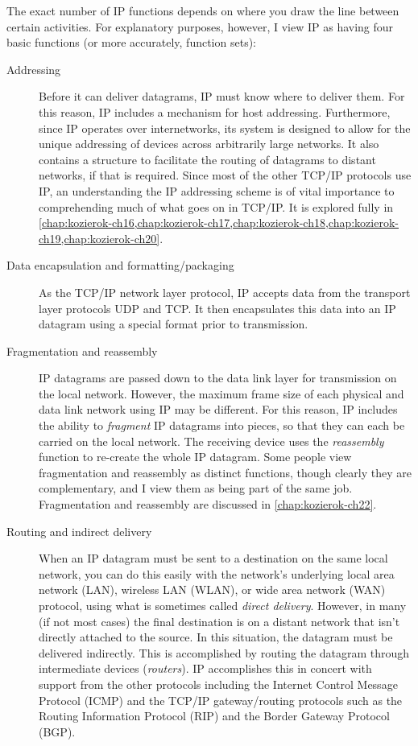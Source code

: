 The exact number of IP functions depends on where you draw the line between certain activities.
For explanatory purposes, however, I view IP as having four basic functions (or more accurately, function sets):
\begin{description}
   \item[Addressing]
      Before it can deliver datagrams, IP must know where to deliver them.
      For this reason, IP includes a mechanism for host addressing.
      Furthermore, since IP operates over internetworks, its system is designed to allow for the unique addressing of devices across arbitrarily large networks.
      It also contains a structure to facilitate the routing of datagrams to distant networks, if that is required.
      Since most of the other TCP/IP protocols use IP, an understanding the IP addressing scheme is of vital importance to comprehending much of what goes on in TCP/IP.
      It is explored fully in \cref{chap:kozierok-ch16,chap:kozierok-ch17,chap:kozierok-ch18,chap:kozierok-ch19,chap:kozierok-ch20}.

   \item[Data encapsulation and formatting/packaging]
      As the TCP/IP network layer protocol, IP accepts data from the transport layer protocols UDP and TCP.
      It then encapsulates this data into an IP datagram using a special format prior to transmission.

   \item[Fragmentation and reassembly]
      IP datagrams are passed down to the data link layer for transmission on the local network.
      However, the maximum frame size of each physical and data link network using IP may be different.
      For this reason, IP includes the ability to {\emph{fragment}} IP datagrams into pieces, so that they can each be carried on the local network.
      The receiving device uses the {\emph{reassembly}} function to re-create the whole IP datagram.
      Some people view fragmentation and reassembly as distinct functions, though clearly they are complementary, and I view them as being part of the same job.
      Fragmentation and reassembly are discussed in \vref{chap:kozierok-ch22}.

   \item[Routing and indirect delivery]
      When an IP datagram must be sent to a destination on the same local network, you can do this easily with the network's underlying local area network (LAN), wireless LAN (WLAN), or wide area network (WAN) protocol, using what is sometimes called {\emph{direct delivery}}.
      However, in many (if not most cases) the final destination is on a distant network that isn't directly attached to the source.
      In this situation, the datagram must be delivered indirectly.
      This is accomplished by routing the datagram through intermediate devices ({\emph{routers}}).
      IP accomplishes this in concert with support from the other protocols including the Internet Control Message Protocol (ICMP) and the TCP/IP gateway/routing protocols such as the Routing Information Protocol (RIP) and the Border Gateway Protocol (BGP).
\end{description}


